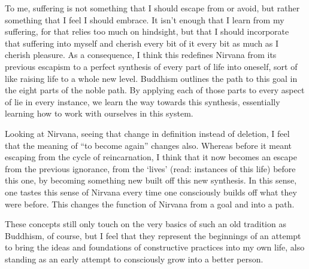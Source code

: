 To me, suffering is not something that I should escape from or avoid, but rather something that I feel I should embrace. It isn't enough that I learn from my suffering, for that relies too much on hindsight, but that I should incorporate that suffering into myself and cherish every bit of it every bit as much as I cherish pleasure. As a consequence, I think this redefines Nirvana from its previous escapism to a perfect synthesis of every part of life into oneself, sort of like raising life to a whole new level. Buddhism outlines the path to this goal in the eight parts of the noble path. By applying each of those parts to every aspect of lie in every instance, we learn the way towards this synthesis, essentially learning how to work with ourselves in this system.

Looking at Nirvana, seeing that change in definition instead of deletion, I feel that the meaning of ``to become again'' changes also. Whereas before it meant escaping from the cycle of reincarnation, I think that it now becomes an escape from the previous ignorance, from the `lives' (read: instances of this life) before this one, by becoming something new built off this new synthesis. In this sense, one tastes this sense of Nirvana every time one consciously builds off what they were before. This changes the function of Nirvana from a goal and into a path.

These concepts still only touch on the very basics of such an old tradition as Buddhism, of course, but I feel that they represent the beginnings of an attempt to bring the ideas and foundations of constructive practices into my own life, also standing as an early attempt to consciously grow into a better person.
